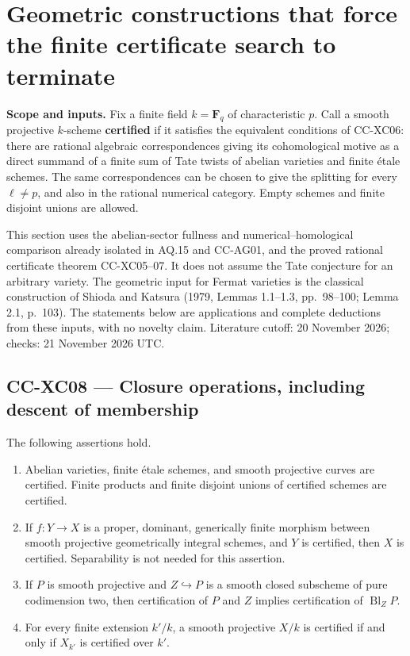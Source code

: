 \section{Geometric constructions that force the finite certificate
search to
terminate}\label{geometric-constructions-that-force-the-finite-certificate-search-to-terminate}

\textbf{Scope and inputs.} Fix a finite field \(k=\mathbf F_q\) of
characteristic \(p\). Call a smooth projective \(k\)-scheme
\textbf{certified} if it satisfies the equivalent conditions of CC-XC06:
there are rational algebraic correspondences giving its cohomological
motive as a direct summand of a finite sum of Tate twists of abelian
varieties and finite étale schemes. The same correspondences can be
chosen to give the splitting for every \(\ell\ne p\), and also in the
rational numerical category. Empty schemes and finite disjoint unions
are allowed.

This section uses the abelian-sector fullness and numerical--homological
comparison already isolated in AQ.15 and CC-AG01, and the proved
rational certificate theorem CC-XC05--07. It does not assume the Tate
conjecture for an arbitrary variety. The geometric input for Fermat
varieties is the classical construction of Shioda and Katsura (1979,
Lemmas 1.1--1.3, pp.~98--100; Lemma 2.1, p.~103). The statements below
are applications and complete deductions from these inputs, with no
novelty claim. Literature cutoff: 20 November 2026; checks: 21 November
2026 UTC.

\subsection{CC-XC08 --- Closure operations, including descent of
membership}\label{cc-xc08-closure-operations-including-descent-of-membership}

The following assertions hold.

\begin{enumerate}
\def\labelenumi{\arabic{enumi}.}
\tightlist
\item
  Abelian varieties, finite étale schemes, and smooth projective curves
  are certified. Finite products and finite disjoint unions of certified
  schemes are certified.
\item
  If \(f:Y\to X\) is a proper, dominant, generically finite morphism
  between smooth projective geometrically integral schemes, and \(Y\) is
  certified, then \(X\) is certified. Separability is not needed for
  this assertion.
\item
  If \(P\) is smooth projective and \(Z\hookrightarrow P\) is a smooth
  closed subscheme of pure codimension two, then certification of \(P\)
  and \(Z\) implies certification of \(\operatorname{Bl}_ZP\).
\item
  For every finite extension \(k'/k\), a smooth projective \(X/k\) is
  certified if and only if \(X_{k'}\) is certified over \(k'\).
\end{enumerate}


